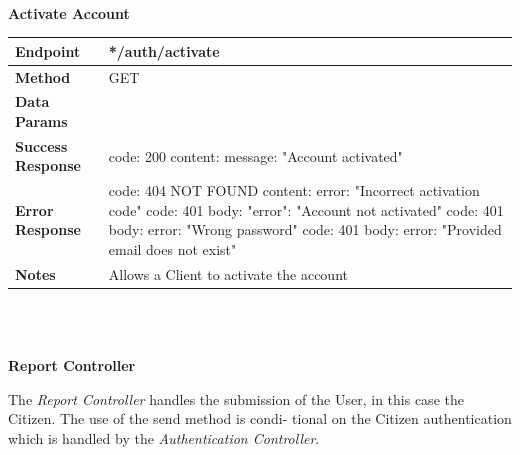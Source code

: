 \documentclass{report}
\begin{document}
\\
\begin{center}{\textbf{Activate Account}}\end{center}
    \begin{tabular}{| l | p{8cm} |}
        \hline
        \textbf{Endpoint} & */auth/activate \\
        \hline
        \textbf{Method} & GET \\
        \hline
        \textbf{Data Params} & \\
        \hline
        \textbf{Success Response} & code: 200 \newline content: {message: "Account activated"}\\
        \hline
        \textbf{Error Response} & code: 404 NOT FOUND \newline content: {error: "Incorrect activation code"} \newline \newline code: 401 \newline body: {"error": "Account not activated"} \newline \newline code: 401 \newline body: {error: "Wrong password"} \newline \newline code: 401 \newline body: {error: "Provided email does not exist"}   \\
        \hline
        \textbf{Notes} & Allows a Client to activate the account \\
        \hline
    \end{tabular}
\\\\
\begin{center}\large{\textbf{Report Controller}}\end{center}
The \textit{Report Controller} handles the submission of the User, in this case the Citizen. The use of the send method is condi-
tional on the Citizen authentication which is handled by the \textit{Authentication Controller}.\\
\end{document}
